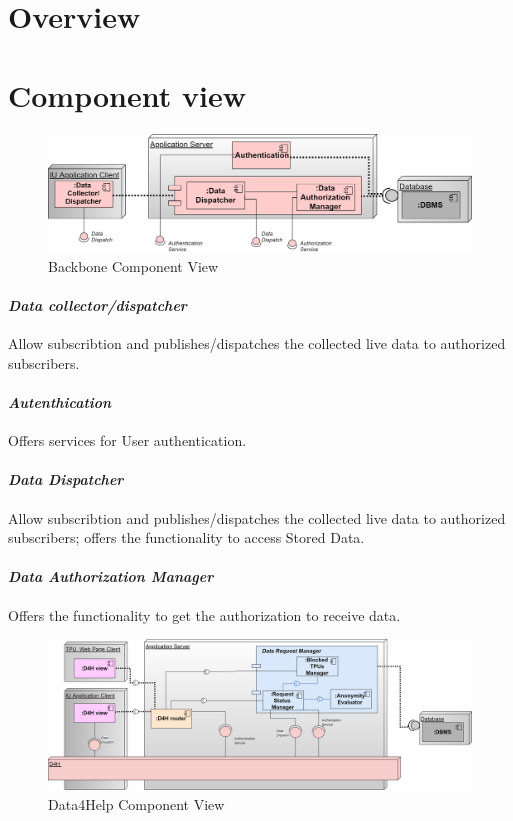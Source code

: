 \section{Overview}
\section{Component view}
\begin{figure}[H]
\caption{Backbone Component View}
\includegraphics[width = \textwidth]{sections/architecturalDesign/BackboneDiagram.png}
\end{figure}
\paragraph{\textit{Data collector/dispatcher}} Allow subscribtion and publishes/dispatches the collected live data to authorized subscribers. 
\paragraph{\textit{Autenthication}} Offers services for User authentication.
\paragraph{\textit{Data Dispatcher}} Allow subscribtion and publishes/dispatches the collected live data to authorized subscribers; offers the functionality to access Stored Data.
\paragraph{\textit{Data Authorization Manager}} Offers the functionality to get the authorization to receive data.
\begin{figure}[H]
\caption{Data4Help Component View}
\includegraphics[width = \textwidth]{sections/architecturalDesign/D4HDiagram.png}
\end{figure}
